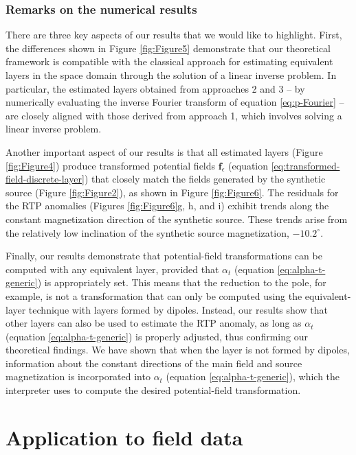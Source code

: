 \documentclass[manuscript,noblind]{geophysics}
\begin{document}
	\subsubsection{Remarks on the numerical results}
	
	There are three key aspects of our results that we would like to highlight.
	First, the differences shown in Figure \ref{fig:Figure5} demonstrate that our theoretical 
	framework is compatible with the classical approach for estimating equivalent layers in the space 
	domain through the solution of a linear inverse problem.
	In particular, the estimated layers obtained from approaches 2 and 3  -- 
	by numerically evaluating the inverse Fourier transform of equation \ref{eq:p-Fourier} --
	are closely aligned with those derived from approach 1, which involves solving a linear inverse problem.
	
	Another important aspect of our results is that all estimated layers (Figure \ref{fig:Figure4}) 
	produce transformed potential fields $\mathbf{f}_{\epsilon}$ (equation \ref{eq:transformed-field-discrete-layer})  
	that closely match the fields generated by the synthetic source (Figure \ref{fig:Figure2}), 
	as shown in Figure \ref{fig:Figure6}. The residuals for the RTP anomalies 
	(Figures \ref{fig:Figure6}g, h, and i) exhibit trends along the constant magnetization direction of 
	the synthetic source. These trends arise from the relatively low inclination of the synthetic source 
	magnetization, $-10.2^{\circ}$.
	
	Finally, our results demonstrate that potential-field transformations can be computed with any 
	equivalent layer, provided that $\alpha_{t}$ (equation \ref{eq:alpha-t-generic}) is appropriately 
	set. This means that the reduction to the pole, for example, is not a transformation that can only 
	be computed using the equivalent-layer technique with layers formed by dipoles. Instead, our 
	results show that other layers can also be used to estimate the RTP anomaly, as long as $\alpha_{t}$ 
	(equation \ref{eq:alpha-t-generic}) is properly adjusted, thus confirming our theoretical findings. 
	We have shown that when the layer is not formed by dipoles, information about the constant directions 
	of the main field and source magnetization is incorporated into $\alpha_{t}$ 
	(equation \ref{eq:alpha-t-generic}), which the interpreter uses to compute the desired 
	potential-field transformation.
	
	\section{Application to field data}
	\label{eq:field_data}
	
\end{document}
